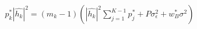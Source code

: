 \documentclass[preview]{standalone}
\begin{document}
\begin{align*}
p_k^\ast \left|\hat{h_k}\right|^2 = \left(m_k-1\right) \left(\left|\hat{h_k}\right|^2 \sum_{j=1}^{K-1} {p_j^\ast} + P \sigma_{\epsilon}^2 + w_B^\ast \sigma^2\right)
\end{align*}
\end{document}
